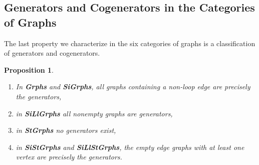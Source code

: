 \documentclass[11pt]{article}
\newtheorem{proposition}[theorem]{Proposition}
\begin{document}
\subsection{Generators and Cogenerators in the Categories of Graphs}
\indent The last property we characterize in the six categories of graphs is a classification of generators and cogenerators.
\begin{proposition}
\begin{enumerate}
\item In \textbf{Grphs} and \textbf{SiGrphs}, all graphs containing a non-loop edge are precisely the generators,
\item in \textbf{SiLlGrphs} all nonempty graphs are generators,
\item in \textbf{StGrphs} no generators exist,
\item in \textbf{SiStGrphs} and \textbf{SiLlStGrphs}, the empty edge graphs with at least one vertex are precisely the generators.
\end{enumerate}
\end{proposition}
\end{document}
